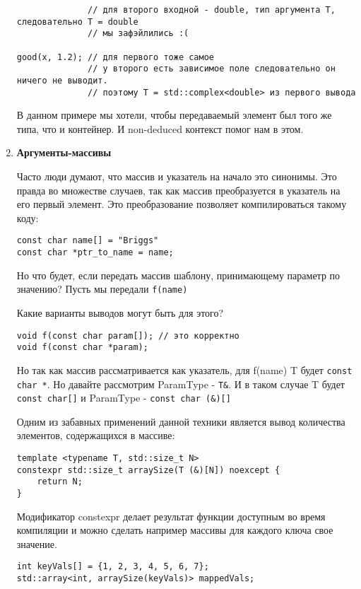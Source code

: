 \begin{enumerate}
\begin{verbatim}
			  // для второго входной - double, тип аргумента T, следовательно T = double
			  // мы зафэйлились :(

good(x, 1.2); // для первого тоже самое
			  // у второго есть зависимое поле следовательно он ничего не выводит.
			  // поэтому T = std::complex<double> из первого вывода
\end{verbatim}
				
				В данном примере мы хотели, чтобы передаваемый элемент был того же типа, что и контейнер. И non-deduced контекст помог нам в этом.
				
				\item \textbf{Аргументы-массивы}
				
				Часто люди думают, что массив и указатель на начало это синонимы. Это правда во множестве случаев, так как массив преобразуется в указатель на его первый элемент. Это преобразование позволяет компилироваться такому коду:
				
\begin{verbatim}
const char name[] = "Briggs"
const char *ptr_to_name = name;
\end{verbatim}
				
				Но что будет, если передать массив шаблону, принимающему параметр по значению?
				Пусть мы передали \texttt{f(name)}
				
				Какие варианты выводов могут быть для этого?
				
\begin{verbatim}
void f(const char param[]); // это корректно
void f(const char *param);
\end{verbatim}
				
				Но так как массив рассматривается как указатель, для f(name) T будет \texttt{const char *}.
				Но давайте рассмотрим ParamType - \texttt{T&}. И в таком случае T будет \texttt{const char[]} и ParamType -  \texttt{const char (&)[]}
				
				Одним из забавных применений данной техники является вывод количества элементов, содержащихся в массиве:
				
\begin{verbatim}
template <typename T, std::size_t N>
constexpr std::size_t arraySize(T (&)[N]) noexcept {
	return N;
}
\end{verbatim}
				Модификатор constexpr делает результат функции доступным во время компиляции и можно сделать например массивы для каждого ключа свое значение.
\begin{verbatim}
int keyVals[] = {1, 2, 3, 4, 5, 6, 7};
std::array<int, arraySize(keyVals)> mappedVals;
\end{verbatim}
				

\end{enumerate}
